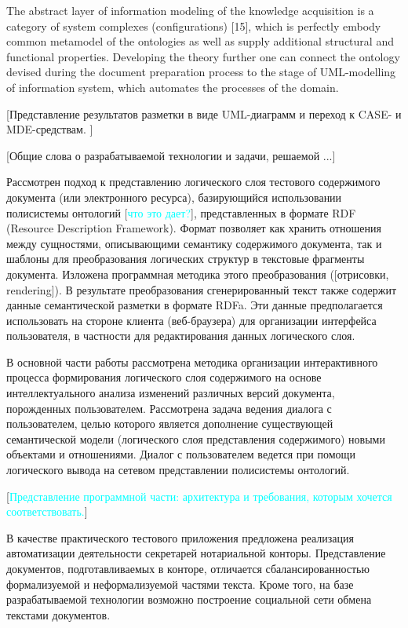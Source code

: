 \documentclass[utf8]{../IncArticle}
\newcommand{\e}[2][fcolor]{\textcolor{pcolor}{[}\textcolor{#1}{#2}\textcolor{pcolor}{]}}
\begin{document}
The abstract layer of information modeling of the knowledge
acquisition is a category of system complexes (configurations) [15],
which is perfectly embody common metamodel of the ontologies as well
as supply additional structural and functional properties. Developing
the theory further one can connect the ontology devised during the
document preparation process to the stage of UML-modelling of
information system, which automates the processes of the domain.

\e{Представление результатов разметки в виде UML-диаграмм и переход к
  CASE- и MDE-средствам. }

\conclusion

\e{Общие слова о разрабатываемой технологии и задачи, решаемой ...}

Рассмотрен подход к представлению логического слоя тестового
содержимого документа (или электронного ресурса), базирующийся
использовании полисистемы онтологий \e[cyan]{что это дает?}, представленных в формате RDF
(Resource Description Framework).  Формат позволяет как хранить
отношения между сущностями, описывающими семантику содержимого
документа, так и шаблоны для преобразования логических структур в
текстовые фрагменты документа.  Изложена программная методика этого преобразования
(\e{отрисовки, rendering}).  В результате преобразования
сгенерированный текст также содержит данные семантической разметки в
формате RDFa.  Эти данные предполагается использовать на стороне
клиента (веб-браузера) для организации интерфейса пользователя, в
частности для редактирования данных логического слоя.

В основной части работы рассмотрена методика организации интерактивного
процесса формирования логического слоя содержимого на основе
интеллектуального анализа изменений различных версий документа,
порожденных пользователем.  Рассмотрена задача ведения диалога с
пользователем, целью которого является дополнение существующей
семантической модели (логического слоя представления содержимого)
новыми объектами и отношениями.  Диалог с пользователем ведется при
помощи логического вывода на сетевом представлении полисистемы онтологий.

\e[cyan]{Представление программной части: архитектура и требования,
  которым хочется соответствовать.}

В качестве практического тестового приложения предложена реализация
автоматизации деятельности секретарей нотариальной конторы.
Представление документов, подготавливаемых в конторе, отличается
сбалансированностью формализуемой и неформализуемой частями текста.
Кроме того, на базе разрабатываемой технологии возможно построение
социальной сети обмена текстами документов.
\end{document}
